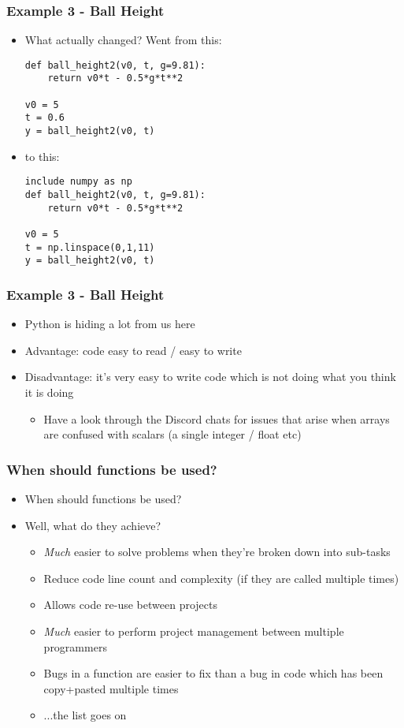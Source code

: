 \documentclass[english,14pt]{beamer}
\begin{document}
\begin{frame}[fragile]
\frametitle{Example 3 - Ball Height}
\begin{itemize}
    \item What actually changed? Went from this:
\begin{lstlisting}[style=CStyle]
def ball_height2(v0, t, g=9.81):    
    return v0*t - 0.5*g*t**2      
    
v0 = 5
t = 0.6
y = ball_height2(v0, t)  
\end{lstlisting}
    \item to this:
\begin{lstlisting}[style=CStyle]
include numpy as np
def ball_height2(v0, t, g=9.81):    
    return v0*t - 0.5*g*t**2      
    
v0 = 5
t = np.linspace(0,1,11)
y = ball_height2(v0, t)  
\end{lstlisting}
	\end{itemize}
\end{frame}

\begin{frame}
\frametitle{Example 3 - Ball Height}
\begin{itemize}
    \item Python is hiding a lot from us here
    \item Advantage: code easy to read / easy to write
    \item Disadvantage: it's very easy to write code which is not doing what you think it is doing
    \begin{itemize}
        \item Have a look through the Discord chats for issues that arise when arrays are confused with scalars (a single integer / float etc)
 	\end{itemize}      
\end{itemize}
\end{frame}

\begin{frame}
\frametitle{When should functions be used?}
\begin{itemize}
\item When should functions be used?
 
\item Well, what do they achieve?
	\begin{itemize}
		\item \textit{Much} easier to solve problems when they're broken down into sub-tasks
		\item Reduce code line count and complexity (if they are called multiple times)
		\item Allows code re-use between projects
		\item \textit{Much} easier to perform project management between multiple programmers
		\item Bugs in a function are easier to fix than a bug in code which has been copy+pasted multiple times
		\item ...the list goes on
	\end{itemize}
\end{itemize}
\end{frame}
\end{document}
